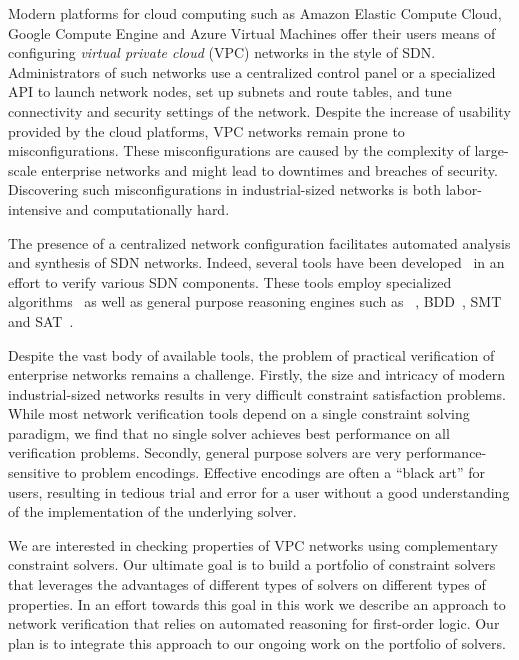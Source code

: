 Modern platforms for cloud computing such as Amazon Elastic Compute Cloud, Google Compute Engine and Azure Virtual Machines offer their users means of configuring \emph{virtual private cloud} (VPC) networks in the style of SDN. Administrators of such networks use a centralized control panel or a specialized API to launch network nodes, set up subnets and route tables, and tune connectivity and security settings of the network. Despite the increase of usability provided by the cloud platforms, VPC networks remain prone to misconfigurations. These misconfigurations are caused by the complexity of large-scale enterprise networks and might lead to downtimes and breaches of security. Discovering such misconfigurations in industrial-sized networks is both labor-intensive and computationally hard. %

The presence of a centralized network configuration facilitates automated analysis and synthesis of SDN networks. Indeed, several tools have been developed~\cite{batfish,jayaraman2014automated,DBLP:conf/icdcit/BjornerJ15,DBLP:conf/pldi/BallBGIKSSV14,Veriflow,ConfigChecker,Anteater,DBLP:conf/cav/El-HassanyTVV17} in an effort to verify various SDN components. These tools employ specialized algorithms~\cite{Veriflow} as well as general purpose reasoning engines such as \Datalog~\cite{muZ, DBLP:conf/cav/El-HassanyTVV17,batfish}, BDD~\cite{ConfigChecker}, SMT~\cite{jayaraman2014automated,DBLP:conf/icdcit/BjornerJ15} and SAT~\cite{Anteater,DBLP:conf/pldi/BallBGIKSSV14}.

%
%
Despite the vast body of available tools, the problem of practical verification of enterprise networks remains a challenge. Firstly, the size and intricacy of modern industrial-sized networks results in very difficult constraint satisfaction problems. While most network verification tools depend on a single constraint solving paradigm, we find that no single solver achieves best performance on all verification problems. Secondly, general purpose solvers are very performance-sensitive to problem encodings. Effective encodings are often a ``black art'' for users, resulting in tedious trial and error for a user without a good understanding of the implementation of the underlying solver.

We are interested in checking properties of VPC networks using complementary constraint solvers. Our ultimate goal is to build a portfolio of constraint solvers that leverages the advantages of different types of solvers on different types of properties. In an effort towards this goal in this work we describe an approach to network verification that relies on automated reasoning for first-order logic. Our plan is to integrate this approach to our ongoing work on the portfolio of solvers.

